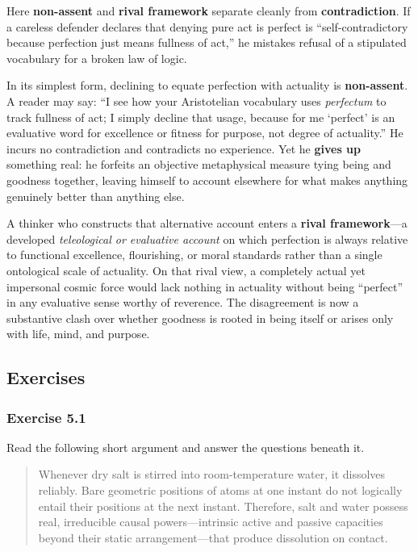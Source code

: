 Here \textbf{non-assent} and \textbf{rival framework} separate cleanly from \textbf{contradiction}. If a careless defender declares that denying pure act is perfect is ``self-contradictory because perfection just means fullness of act,'' he mistakes refusal of a stipulated vocabulary for a broken law of logic.

In its simplest form, declining to equate perfection with actuality is \textbf{non-assent}. A reader may say: ``I see how your Aristotelian vocabulary uses \emph{perfectum} to track fullness of act; I simply decline that usage, because for me `perfect' is an evaluative word for excellence or fitness for purpose, not degree of actuality.'' He incurs no contradiction and contradicts no experience. Yet he \textbf{gives up} something real: he forfeits an objective metaphysical measure tying being and goodness together, leaving himself to account elsewhere for what makes anything genuinely better than anything else.

A thinker who constructs that alternative account enters a \textbf{rival framework}---a developed \emph{teleological or evaluative account} on which perfection is always relative to functional excellence, flourishing, or moral standards rather than a single ontological scale of actuality. On that rival view, a completely actual yet impersonal cosmic force would lack nothing in actuality without being ``perfect'' in any evaluative sense worthy of reverence. The disagreement is now a substantive clash over whether goodness is rooted in being itself or arises only with life, mind, and purpose.

\subsection{Exercises}

\subsubsection*{Exercise 5.1}
Read the following short argument and answer the questions beneath it.

\begin{quote}
Whenever dry salt is stirred into room-temperature water, it dissolves reliably. Bare geometric positions of atoms at one instant do not logically entail their positions at the next instant. Therefore, salt and water possess real, irreducible causal powers---intrinsic active and passive capacities beyond their static arrangement---that produce dissolution on contact.
\end{quote}

